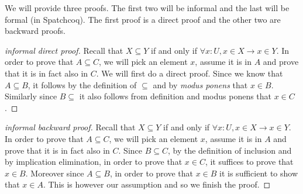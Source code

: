 We will provide three proofs. The first two will be informal and the last will be formal (in Spatchcoq). The first proof is a direct proof and the other two are backward proofs.
\begin{proof}[informal direct proof]

Recall that $X\subseteq Y$ if and only if $\forall x:U, x \in X \rightarrow x \in Y$.
 In order to prove that $ A\subseteq C$, we will pick an element $x$, assume it is in $A$ and prove that it is in fact also in $C$. We will first do a direct proof. Since we know that $A\subseteq B$,  it follows by the definition of $\subseteq$ and by {\it modus ponens} that $x \in B$. Similarly since $B\subseteq$ it also follows from definition and modus ponens that $x\in C$.
\end{proof}
\begin{proof}[informal backward  proof]

Recall that $X\subseteq Y$ if and only if $\forall x:U, x \in X \rightarrow x \in Y$.
 In order to prove that $ A\subseteq C$, we will pick an element $x$, assume it is in $A$ and prove that it is in fact also in $C$. 
Since $B \subseteq C$, by the definition of inclusion and by implication elimination, in order to prove that $x \in C$, it suffices to prove that $x \in B$. Moreover since $A\subseteq B$, in order to prove that $x \in B$ it is sufficient to show that $x \in A$. This is however our assumption and so we finish the proof.
\end{proof}

